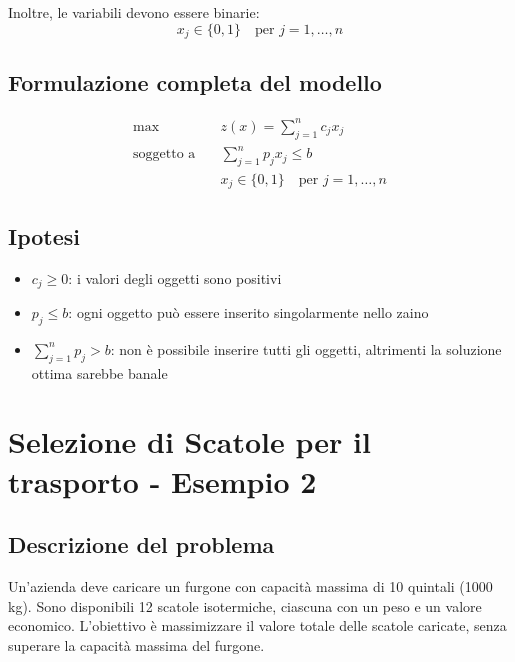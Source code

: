 Inoltre, le variabili devono essere binarie:
\[
x_j \in \{0, 1\} \quad \text{per } j = 1, \ldots, n
\]

\subsection{Formulazione completa del modello}
\[
\begin{aligned}
\max \quad & z(x) = \sum_{j=1}^{n} c_j x_j \\
\text{soggetto a} \quad & \sum_{j=1}^{n} p_j x_j \leq b \\
& x_j \in \{0, 1\} \quad \text{per } j = 1, \dots, n
\end{aligned}
\]

\subsection{Ipotesi}
\begin{itemize}
    \item $c_j \geq 0$: i valori degli oggetti sono positivi
    \item $p_j \leq b$: ogni oggetto può essere inserito singolarmente nello zaino
    \item $\sum_{j=1}^{n} p_j > b$: non è possibile inserire tutti gli oggetti, altrimenti la soluzione ottima sarebbe banale
\end{itemize}

\section{Selezione di Scatole per il trasporto - Esempio 2}
\subsection{Descrizione del problema}

Un'azienda deve caricare un furgone con capacità massima di 10 quintali 
(1000 kg). Sono disponibili 12 scatole isotermiche, ciascuna con un peso e un valore 
economico. L'obiettivo è massimizzare il valore totale delle scatole caricate, 
senza superare la capacità massima del furgone.

